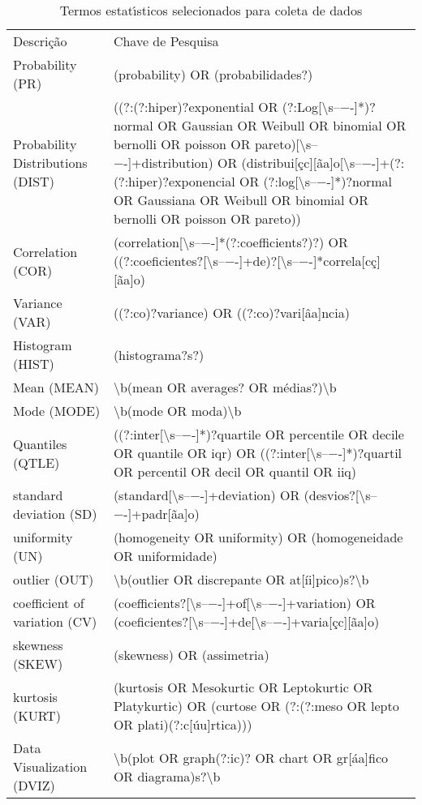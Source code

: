 \begin{table}
\caption{Termos estatı́sticos selecionados para coleta de dados}
\begin{tabular}{ll}
Descrição & Chave de Pesquisa \\
Probability (PR) & (probability) OR (probabilidades?) \\
Probability Distributions (DIST) & ((?:(?:hiper)?exponential OR (?:Log[\textbackslash s–−-]*)?normal OR Gaussian OR Weibull OR binomial OR bernolli OR poisson OR pareto)[\textbackslash s–−-]+distribution) OR (distribui[çc][ãa]o[\textbackslash s–−-]+(?:(?:hiper)?exponencial OR (?:log[\textbackslash s–−-]*)?normal OR Gaussiana OR Weibull OR binomial OR bernolli OR poisson OR pareto)) \\
Correlation (COR) & (correlation[\textbackslash s–−-]*(?:coefficients?)?) OR ((?:coeficientes?[\textbackslash s–−-]+de)?[\textbackslash s–−-]*correla[cç][ãa]o) \\
Variance (VAR) & ((?:co)?variance) OR ((?:co)?vari[âa]ncia) \\
Histogram (HIST) & (histograma?s?) \\
Mean (MEAN) & \textbackslash b(mean OR averages? OR médias?)\textbackslash b \\
Mode (MODE) & \textbackslash b(mode OR moda)\textbackslash b \\
Quantiles (QTLE) & ((?:inter[\textbackslash s–−-]*)?quartile OR percentile OR decile OR quantile OR iqr) OR ((?:inter[\textbackslash s–−-]*)?quartil OR percentil OR decil OR quantil OR iiq) \\
standard deviation (SD) & (standard[\textbackslash s–−-]+deviation) OR (desvios?[\textbackslash s–−-]+padr[ãa]o) \\
uniformity (UN) & (homogeneity OR uniformity) OR (homogeneidade OR uniformidade) \\
outlier (OUT) & \textbackslash b(outlier OR discrepante OR at[íi]pico)s?\textbackslash b \\
coefficient of variation (CV) & (coefficients?[\textbackslash s–−-]+of[\textbackslash s–−-]+variation) OR (coeficientes?[\textbackslash s–−-]+de[\textbackslash s–−-]+varia[çc][ãa]o) \\
skewness (SKEW) & (skewness) OR (assimetria) \\
kurtosis (KURT) & (kurtosis OR Mesokurtic OR Leptokurtic OR Platykurtic) OR (curtose OR (?:(?:meso OR lepto OR plati)(?:c[úu]rtica))) \\
Data Visualization (DVIZ) & \textbackslash b(plot OR graph(?:ic)? OR chart OR gr[áa]fico OR diagrama)s?\textbackslash b \\

\end{tabular}
\end{table}
